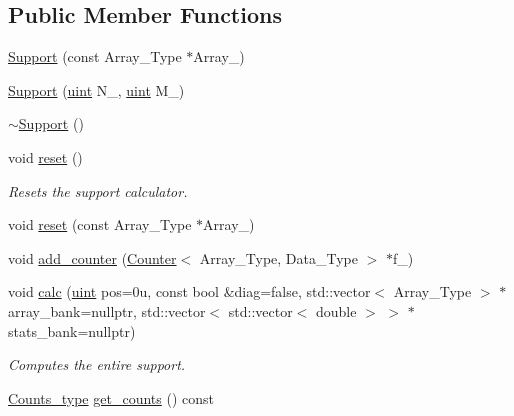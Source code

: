 \subsection*{Public Member Functions}
\begin{DoxyCompactItemize}
\item 
\hyperlink{class_support_a4a0587bc6f1f268005a94fea039ea6ba}{Support} (const Array\+\_\+\+Type $\ast$Array\+\_\+)
\item 
\hyperlink{class_support_aff7d2705d6f765fcbd8958453b7dbefe}{Support} (\hyperlink{typedefs_8hpp_a91ad9478d81a7aaf2593e8d9c3d06a14}{uint} N\+\_\+, \hyperlink{typedefs_8hpp_a91ad9478d81a7aaf2593e8d9c3d06a14}{uint} M\+\_\+)
\item 
\hyperlink{class_support_a03228371869980fa356b7b86871d94e8}{$\sim$\+Support} ()
\item 
void \hyperlink{class_support_a5878ac60282fc1380c92f3ba502f249e}{reset} ()
\begin{DoxyCompactList}\small\item\em Resets the support calculator. \end{DoxyCompactList}\item 
void \hyperlink{class_support_afbe207cc2762bc698c9ccb3212e9de78}{reset} (const Array\+\_\+\+Type $\ast$Array\+\_\+)
\item 
void \hyperlink{class_support_a0ad8bb6202451253697d771a28859210}{add\+\_\+counter} (\hyperlink{class_counter}{Counter}$<$ Array\+\_\+\+Type, Data\+\_\+\+Type $>$ $\ast$f\+\_\+)
\item 
void \hyperlink{class_support_ab5261952be0746f188ee024e3e8c26c1}{calc} (\hyperlink{typedefs_8hpp_a91ad9478d81a7aaf2593e8d9c3d06a14}{uint} pos=0u, const bool \&diag=false, std\+::vector$<$ Array\+\_\+\+Type $>$ $\ast$array\+\_\+bank=nullptr, std\+::vector$<$ std\+::vector$<$ double $>$ $>$ $\ast$stats\+\_\+bank=nullptr)
\begin{DoxyCompactList}\small\item\em Computes the entire support. \end{DoxyCompactList}\item 
\hyperlink{typedefs_8hpp_aee40fa17c1fddb63dd1f2b1470ade95b}{Counts\+\_\+type} \hyperlink{class_support_a00ebb01a467b41e4b65df4c9a916909b}{get\+\_\+counts} () const
\end{DoxyCompactItemize}
